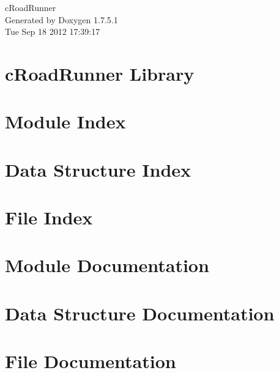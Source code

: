 \documentclass[a4paper]{book}
\begin{document}
\hypersetup{pageanchor=false,citecolor=blue}
\begin{titlepage}
\vspace*{7cm}
\begin{center}
{\Large c\-Road\-Runner }\\
\vspace*{1cm}
{\large \-Generated by Doxygen 1.7.5.1}\\
\vspace*{0.5cm}
{\small Tue Sep 18 2012 17:39:17}\\
\end{center}
\end{titlepage}
\clearemptydoublepage
{}
\tableofcontents
\clearemptydoublepage
{}
\hypersetup{pageanchor=true,citecolor=blue}
\chapter{c\-Road\-Runner \-Library}
\label{index}\hypertarget{index}{}
\chapter{\-Module \-Index}

\chapter{\-Data \-Structure \-Index}

\chapter{\-File \-Index}

\chapter{\-Module \-Documentation}




















\chapter{\-Data \-Structure \-Documentation}







\chapter{\-File \-Documentation}




\printindex
\end{document}
